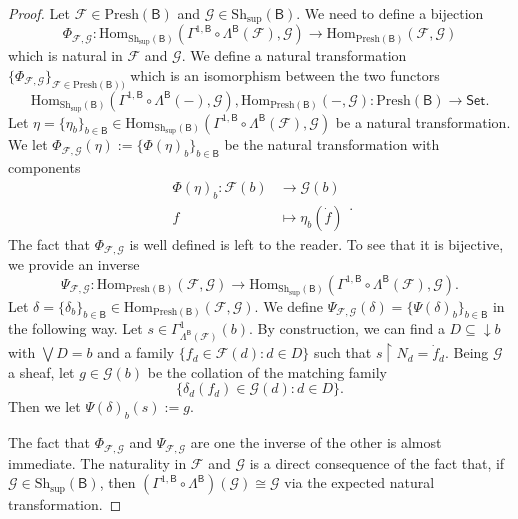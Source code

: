 \documentclass[11pt]{amsart}
\newcommand{\F}{\mathcal{F}}
\newcommand{\G}{\mathcal{G}}
\newcommand{\Hom}{\textrm{Hom}}
\newcommand{\Presh}{\textrm{Presh}}
\newcommand{\Sh}{\textrm{Sh}}
\theoremstyle{plain}
\theoremstyle{definition}
\theoremstyle{plain}
\theoremstyle{remark}
\newcommand{\dSet}{\mathsf{Set}}
\newcommand{\bool}[1]{\mathsf{#1}}
\newcommand{\0}{\mathsf{0}}
\renewcommand{\1}{\mathsf{1}}
\renewcommand{\2}{\mathsf{2}}
\theoremstyle{definition}
\begin{document}
\begin{proof}
Let $\F\in\Presh(\bool{B})$ and $\G\in\Sh_{\mathrm{sup}}(\bool{B})$. 
We need to define a bijection
\[
\Phi_{\F, \G}:\Hom_{\Sh_{\mathrm{sup}}(\bool{B})}(\Gamma^{1,\bool{B}}\circ\Lambda^\bool{B}(\F), \G)\to\Hom_{\Presh(\bool{B})}(\F,\G)
\]
which is natural in $\F$ and $\G$. We define a natural transformation $\{\Phi_{\F, \G}\}_{\F\in\Presh(\bool{B}))}$ which is an isomorphism between the two functors
\[
\Hom_{\Sh_{\mathrm{sup}}(\bool{B})}(\Gamma^{1,\bool{B}}\circ\Lambda^{\bool{B}}(-), \G),\Hom_{\Presh(\bool{B})}(-, \G):\Presh(\bool{B})\to\dSet.
\]
Let $\eta=\{\eta_b\}_{b\in\bool{B}}\in\Hom_{\Sh_{\mathrm{sup}}(\bool{B})}(\Gamma^{1,\bool{B}}\circ\Lambda^{\bool{B}}(\F), \G)$ be a natural transformation.
We let $\Phi_{\F, \G}(\eta):=\{\Phi(\eta)_b\}_{b\in\bool{B}}$ be the natural transformation with components 
\[
\begin{aligned}
\Phi(\eta)_{b}:\F(b)&\to\G(b)\\
f&\mapsto\eta_b(\dot{f})
\end{aligned}.
\]
 The fact that $\Phi_{\F, \G}$ is well defined is left to the reader. To see that it is bijective, we provide an inverse
 \[
 \Psi_{\F, \G}:\Hom_{\Presh(\bool{B})}(\F, \G)\to\Hom_{\Sh_{\mathrm{sup}}(\bool{B})}(\Gamma^{1,\bool{B}}\circ\Lambda^{\bool{B}}(\F), \G).
 \]
 Let $\delta=\{\delta_b\}_{b\in\bool{B}}\in\Hom_{\Presh(\bool{B})}(\F, \G)$. We define $\Psi_{\F, \G}(\delta)=\{\Psi(\delta)_b\}_{b\in\bool{B}}$ in the following way. Let $s\in\Gamma^1_{\Lambda^{\bool{B}}(\F)}(b)$. By construction, we can find a $D\subseteq\downarrow b$ with $\bigvee D=b$ and a family $\{f_d\in\F(d): d\in D\}$ such that  $s\restriction N_d=\dot{f}_d$. Being $\G$ a sheaf, let $g\in\G(b)$ be the collation of the matching family \[\{\delta_{d}(f_d)\in\G(d): d\in D\}.\] Then we let $\Psi(\delta)_{b}(s):=g$.
 
 The fact that $\Phi_{\F, \G}$ and $\Psi_{\F, \G}$ are one the inverse of the other is almost immediate. The naturality in $\F$ and $\G$ is a direct consequence of the fact that, if $\G\in\Sh_{\mathrm{sup}}(\bool{B})$, then $(\Gamma^{1,\bool{B}}\circ\Lambda^{\bool{B}})(\G)\cong\G$ via the expected natural transformation. 
\end{proof}
\end{document}
